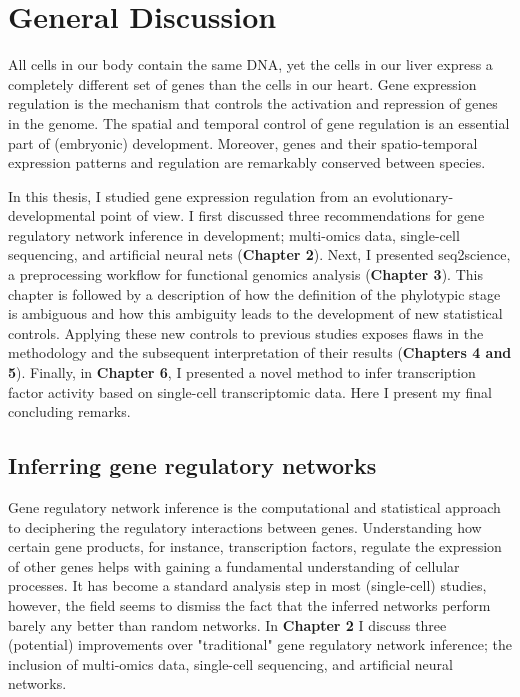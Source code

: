 \chapter{General Discussion}\thumbforchapter
\newpage

All cells in our body contain the same DNA, yet the cells in our liver express a completely different set of genes than the cells in our heart. Gene expression regulation is the mechanism that controls the activation and repression of genes in the genome. The spatial and temporal control of gene regulation is an essential part of (embryonic) development. Moreover, genes and their spatio-temporal expression patterns and regulation are remarkably conserved between species.

In this thesis, I studied gene expression regulation from an evolutionary-developmental point of view. I first discussed three recommendations for gene regulatory network inference in development; multi-omics data, single-cell sequencing, and artificial neural nets (\textbf{Chapter 2}). Next, I presented seq2science, a preprocessing workflow for functional genomics analysis (\textbf{Chapter 3}). This chapter is followed by a description of how the definition of the phylotypic stage is ambiguous and how this ambiguity leads to the development of new statistical controls. Applying these new controls to previous studies exposes flaws in the methodology and the subsequent interpretation of their results (\textbf{Chapters 4 and 5}). Finally, in \textbf{Chapter 6}, I presented a novel method to infer transcription factor activity based on single-cell transcriptomic data. Here I present my final concluding remarks.

\section{Inferring gene regulatory networks}

Gene regulatory network inference is the computational and statistical approach to deciphering the regulatory interactions between genes. Understanding how certain gene products, for instance, transcription factors, regulate the expression of other genes helps with gaining a fundamental understanding of cellular processes. It has become a standard analysis step in most (single-cell) studies, however, the field seems to dismiss the fact that the inferred networks perform barely any better than random networks\cite{McCalla_2021,Chen_2018,Pratapa_2020}. In \textbf{Chapter 2} I discuss three (potential) improvements over "traditional" gene regulatory network inference; the inclusion of multi-omics data, single-cell sequencing, and artificial neural networks.

